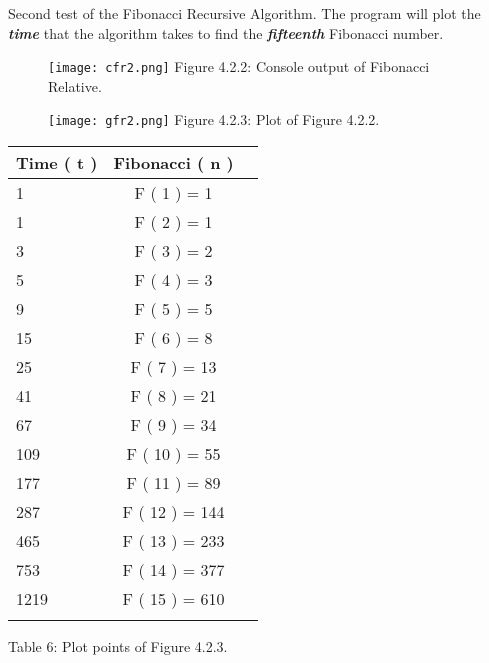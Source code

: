 \documentclass[10pt,a4paper]{article}
\begin{document}
\pagebreak

Second test of the Fibonacci Recursive Algorithm. The program will plot the {\bfseries\itshape time} that the algorithm takes to find the {\bfseries\itshape fifteenth} Fibonacci number.

\begin{figure}[H]
\texttt{[image: cfr2.png]}
\centering \linebreak \linebreak Figure 4.2.2: Console output of Fibonacci Relative.
\end{figure}

\begin{multicols}{2}
\begin{figure}[H]
\texttt{[image: gfr2.png]}
\centering \linebreak \linebreak Figure 4.2.3: Plot of Figure 4.2.2.
\end{figure}

\begin{center}
\begin{tabular}[.5cm]{l c c }
\toprule
Time ( t ) & Fibonacci ( n ) \\
\midrule
1 & F ( 1 ) = 1 \\
\cmidrule{1-2}
1 & F ( 2 ) = 1 \\
\cmidrule{1-2}
3 & F ( 3 ) = 2 \\
\cmidrule{1-2}
5 & F ( 4 ) = 3 \\
\cmidrule{1-2}
9 & F ( 5 ) = 5 \\
\cmidrule{1-2}
15 & F ( 6 ) = 8 \\
\cmidrule{1-2}
25 & F ( 7 ) = 13 \\
\cmidrule{1-2}
41 & F ( 8 ) = 21 \\
\cmidrule{1-2}
67 & F ( 9 ) = 34 \\
\cmidrule{1-2}
109 & F ( 10 ) = 55 \\
\cmidrule{1-2}
177 & F ( 11 ) = 89 \\
\cmidrule{1-2}
287 & F ( 12 ) = 144 \\
\cmidrule{1-2}
465 & F ( 13 ) = 233 \\
\cmidrule{1-2}
753 & F ( 14 ) = 377 \\
\cmidrule{1-2}
1219 & F ( 15 ) = 610 \\
\bottomrule
\linebreak
\end{tabular}
\linebreak Table 6: Plot points of Figure 4.2.3.
\end{center}
\end{multicols} 
\end{document}
